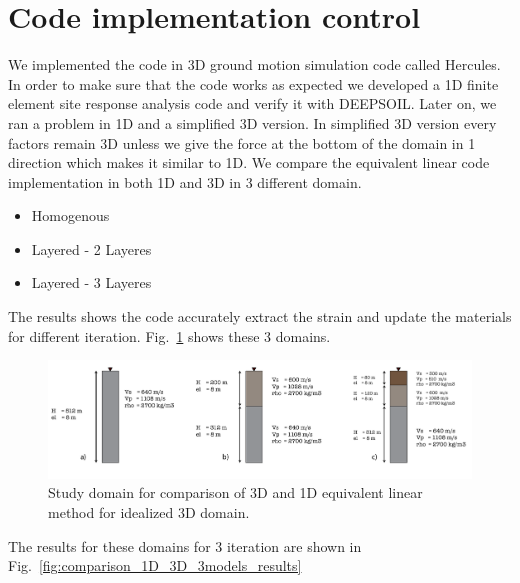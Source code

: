 
\section{Code implementation control}

We implemented the code in 3D ground motion simulation code called Hercules. In order to make sure that the code works as expected we developed a 1D finite element site response analysis code and verify it with DEEPSOIL. Later on, we ran a problem in 1D and a simplified 3D version. In simplified 3D version every factors remain 3D unless we give the force at the bottom of the domain in 1 direction which makes it similar to 1D.  We compare the equivalent linear code implementation in both 1D and 3D in 3 different domain. 

 
\begin{itemize}
  \item Homogenous
  \item Layered - 2 Layeres
  \item Layered - 3 Layeres
\end{itemize}

The results shows the code accurately extract the strain and update the materials for different iteration. Fig.~\ref{fig:comparison_1D_3D_3models} shows these 3 domains. 

 \begin{figure}[H]
    \centering
    \includegraphics[width=\textwidth]{figures/pdf/comparison_1D_3D_3models.pdf}
    \caption{Study domain for comparison of 3D and 1D equivalent linear method for idealized 3D domain.}
    \label{fig:comparison_1D_3D_3models}
\end{figure}

The results for these domains for 3 iteration are shown in Fig.~\ref{fig:comparison_1D_3D_3models_results}

